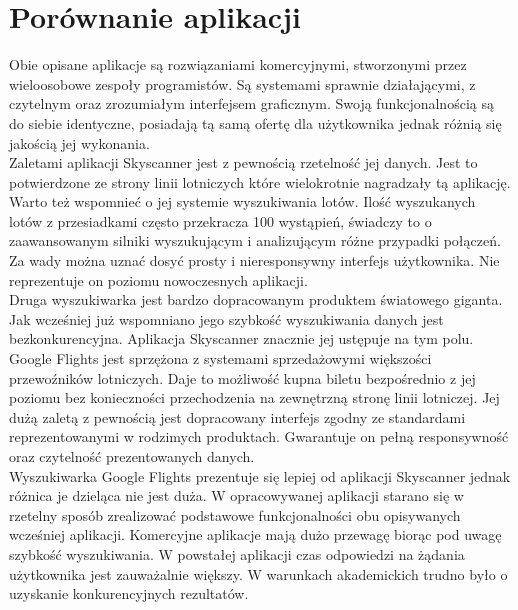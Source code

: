 \documentclass[12pt, twoside]{report}
\begin{document}
\section{Porównanie aplikacji}
Obie opisane aplikacje są rozwiązaniami komercyjnymi, stworzonymi przez wieloosobowe zespoły programistów. Są systemami sprawnie działającymi, z czytelnym oraz zrozumiałym interfejsem graficznym. Swoją funkcjonalnością są do siebie identyczne, posiadają tą samą ofertę dla użytkownika jednak różnią się jakością jej wykonania. \\ \indent
Zaletami aplikacji Skyscanner jest z pewnością rzetelność jej danych. Jest to potwierdzone ze strony linii lotniczych które wielokrotnie nagradzały tą aplikację. Warto też wspomnieć o jej systemie wyszukiwania lotów. Ilość wyszukanych lotów z przesiadkami często przekracza 100 wystąpień, świadczy to o zaawansowanym silniki wyszukującym i analizującym różne przypadki połączeń. Za wady można uznać dosyć prosty i nieresponsywny interfejs użytkownika. Nie reprezentuje on poziomu nowoczesnych aplikacji. \\ \indent
Druga wyszukiwarka jest bardzo dopracowanym produktem światowego giganta. Jak wcześniej już wspomniano jego szybkość wyszukiwania danych jest bezkonkurencyjna. Aplikacja Skyscanner znacznie jej ustępuje na tym polu. Google Flights jest sprzężona z systemami sprzedażowymi większości przewoźników lotniczych. Daje to możliwość kupna biletu bezpośrednio z jej poziomu bez konieczności przechodzenia na zewnętrzną stronę linii lotniczej. Jej dużą zaletą z pewnością jest dopracowany interfejs zgodny ze standardami reprezentowanymi w rodzimych produktach. Gwarantuje on pełną responsywność oraz czytelność prezentowanych danych. \\ \indent
Wyszukiwarka Google Flights prezentuje się lepiej od aplikacji Skyscanner jednak różnica je dzieląca nie jest duża. W opracowywanej aplikacji starano się w rzetelny sposób zrealizować podstawowe funkcjonalności obu opisywanych wcześniej aplikacji. Komercyjne aplikacje mają dużo przewagę biorąc pod uwagę szybkość wyszukiwania. W powstałej aplikacji czas odpowiedzi na żądania użytkownika jest zauważalnie większy. W warunkach akademickich trudno było o uzyskanie konkurencyjnych rezultatów.
\newpage
\end{document}
